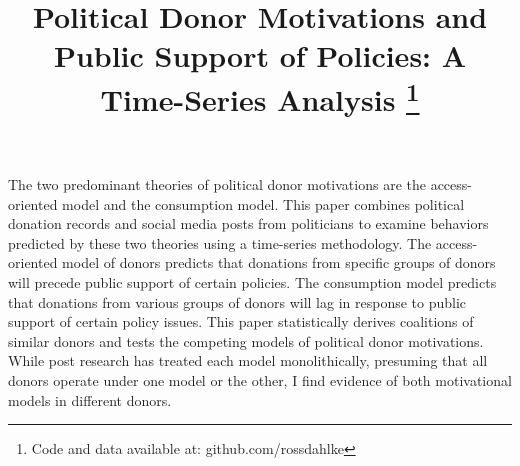 \documentclass[12pt,]{article}
\title{Political Donor Motivations and Public Support of Policies: A
Time-Series Analysis \thanks{Code and data available at:
github.com/rossdahlke}  }
\author{}
\date{}
\renewenvironment{abstract}
 {{%
    \setlength{\leftmargin}{0mm}
    \setlength{\rightmargin}{\leftmargin}%
  }%
  \relax}
 {\endlist}
\begin{document}
	
%    


{%
\setlength{\parindent}{0pt}
\thispagestyle{plain}
{\fontsize{18}{20}\selectfont\raggedright 
\maketitle  %

}

{
   \vskip 13.5pt\relax \normalsize\fontsize{11}{12} 
 

}

}








\begin{abstract}

    \hbox{\vrule height .2pt width 39.14pc}

    \vskip 8.5pt %

\noindent The two predominant theories of political donor motivations
are the access-oriented model and the consumption model. This paper
combines political donation records and social media posts from
politicians to examine behaviors predicted by these two theories using a
time-series methodology. The access-oriented model of donors predicts
that donations from specific groups of donors will precede public
support of certain policies. The consumption model predicts that
donations from various groups of donors will lag in response to public
support of certain policy issues. This paper statistically derives
coalitions of similar donors and tests the competing models of political
donor motivations. While post research has treated each model
monolithically, presuming that all donors operate under one model or the
other, I find evidence of both motivational models in different donors.


    \hbox{\vrule height .2pt width 39.14pc}


\end{abstract}


\vskip -8.5pt



\noindent \doublespacing 
\end{document}
